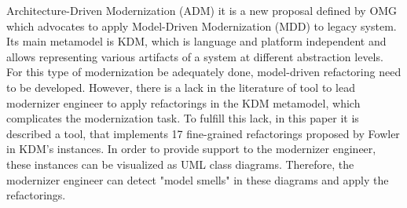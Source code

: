 



Architecture-Driven Modernization (ADM) it is a new proposal defined by OMG which advocates to apply Model-Driven Modernization (MDD) to legacy system. Its main metamodel is KDM, which is language and platform independent and allows representing various artifacts of a system at different abstraction levels. For this type of modernization be adequately done, model-driven refactoring need to be developed. However, there is a lack in the literature of tool to lead modernizer engineer to apply refactorings in the KDM metamodel, which complicates the modernization task. To fulfill this lack, in this paper it is described a tool, that implements 17 fine-grained refactorings proposed by Fowler in KDM's instances. In order to provide support to the modernizer engineer, these instances can be visualized as UML class diagrams. Therefore, the modernizer engineer can detect 
"model smells" in these diagrams and apply the refactorings.







